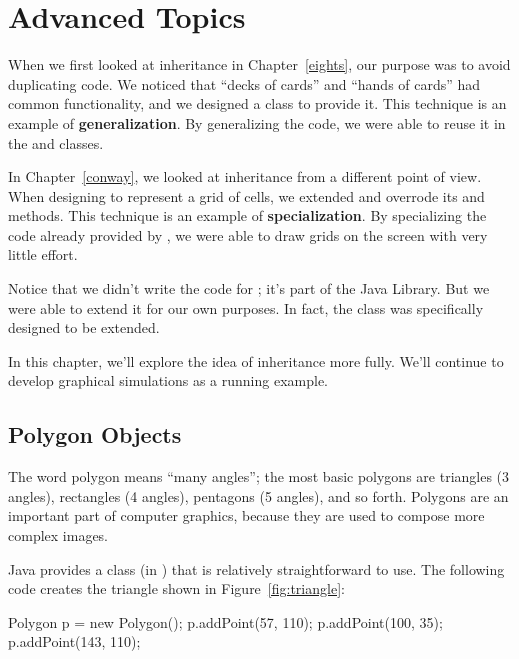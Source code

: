 \chapter{Advanced Topics}


When we first looked at inheritance in Chapter~\ref{eights}, our purpose was to avoid duplicating code.
We noticed that ``decks of cards'' and ``hands of cards'' had common functionality, and we designed a  class to provide it.
This technique is an example of {\bf generalization}.
By generalizing the code, we were able to reuse it in the  and  classes.


In Chapter~\ref{conway}, we looked at inheritance from a different point of view.
When designing  to represent a grid of cells, we extended  and overrode its  and  methods.
This technique is an example of {\bf specialization}.
By specializing the code already provided by , we were able to draw grids on the screen with very little effort.

Notice that we didn't write the code for ; it's part of the Java Library.
But we were able to extend it for our own purposes.
In fact, the  class was specifically designed to be extended.

In this chapter, we'll explore the idea of inheritance more fully.
We'll continue to develop graphical simulations as a running example.


\section{Polygon Objects}

The word polygon means ``many angles''; the most basic polygons are triangles (3 angles), rectangles (4 angles), pentagons (5 angles), and so forth.
Polygons are an important part of computer graphics, because they are used to compose more complex images.

Java provides a  class (in ) that is relatively straightforward to use.
The following code creates the triangle shown in Figure~\ref{fig:triangle}:

\begin{code}
Polygon p = new Polygon();
p.addPoint(57, 110);
p.addPoint(100, 35);
p.addPoint(143, 110);
\end{code}

